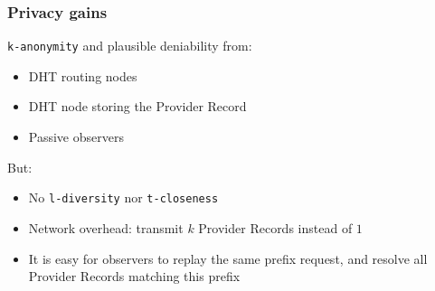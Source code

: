 \documentclass{pl-slide}
\begin{document}
\begin{frame}
\frametitle{Privacy gains}

\texttt{k-anonymity} and plausible deniability from:
\begin{itemize}
	\item DHT routing nodes
	\item DHT node storing the Provider Record
	\item Passive observers
\end{itemize}

But:
\begin{itemize}
	\item No \texttt{l-diversity} nor \texttt{t-closeness}
	\item Network overhead: transmit $k$ Provider Records instead of $1$
	\item It is easy for observers to replay the same prefix request, and resolve all Provider Records matching this prefix
\end{itemize}
\end{frame}
\end{document}
